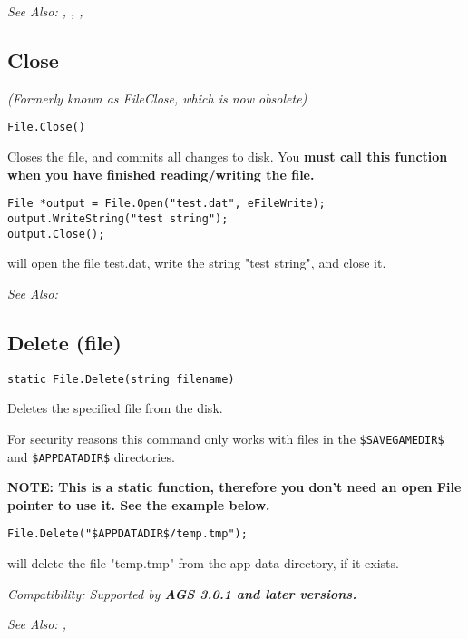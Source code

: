 \it{See Also:} , ,
, 



\subsection{Close}\label{File.Close}%

\it{(Formerly known as FileClose, which is now obsolete)}

\begin{verbatim}
File.Close()
\end{verbatim}
Closes the file, and commits all changes to disk.
You \bf{must} call this function when you have finished reading/writing the file.

\begin{verbatim}
File *output = File.Open("test.dat", eFileWrite);
output.WriteString("test string");
output.Close();
\end{verbatim}
will open the file test.dat, write the string "test string", and close it.

\it{See Also:} 


\subsection{Delete (file)}\label{File.Delete}%

\begin{verbatim}
static File.Delete(string filename)
\end{verbatim}
Deletes the specified file from the disk.

For security reasons this command only works with files in the \verb^$SAVEGAMEDIR$^ and \verb^$APPDATADIR$^ directories.

\bf{NOTE:} This is a static function, therefore you don't need an open File pointer
to use it. See the example below.

\begin{verbatim}
File.Delete("$APPDATADIR$/temp.tmp");
\end{verbatim}
will delete the file "temp.tmp" from the app data directory, if it exists.

\it{Compatibility:} Supported by \bf{AGS 3.0.1} and later versions.

\it{See Also:} , 


